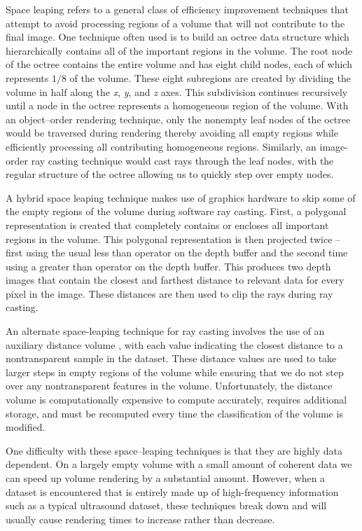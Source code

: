 Space leaping refers to a general class of efficiency improvement techniques that attempt to avoid processing regions of a volume that will not contribute to the final image. One technique often used is to build an octree data structure which hierarchically contains all of the important regions in the volume. The root node of the octree contains the entire volume and has eight child nodes, each of which represents $1/8$ of the volume. These eight subregions are created by dividing the volume in half along the \emph{x}, \emph{y}, and \emph{z} axes. This subdivision continues recursively until a node in the octree represents a homogeneous region of the volume. With an object--order rendering technique, only the nonempty leaf nodes of the octree would be traversed during rendering thereby avoiding all empty regions while efficiently processing all contributing homogeneous regions. Similarly, an image-order ray casting technique would cast rays through the leaf nodes, with the regular structure of the octree allowing us to quickly step over empty nodes.

A hybrid space leaping technique \cite{Sobierajski95} makes use of graphics hardware to skip some of the empty regions of the volume during software ray casting. First, a polygonal representation is created that completely contains or encloses all important regions in the volume. This polygonal representation is then projected twice -- first using the usual less than operator on the depth buffer and the
second time using a greater than operator on the depth buffer. This produces two depth images that contain the closest and farthest distance to relevant data for every pixel in the image. These distances are then used to clip the rays during ray casting.

An alternate space-leaping technique for ray casting involves the use of an auxiliary distance volume \cite{Zuiderveld92}, with each value indicating the closest distance to a nontransparent sample in the dataset. These distance values are used to take larger steps in empty regions of the volume while ensuring that we do not step over any nontransparent features in the volume. Unfortunately, the distance volume is computationally expensive to compute accurately, requires additional storage, and must be recomputed every time the classification of the volume is modified.

One difficulty with these space--leaping techniques is that they are highly data dependent. On a largely empty volume with a small amount of coherent data we can speed up volume rendering by a substantial amount. However, when a dataset is encountered that is entirely made up of high-frequency information such as a typical ultrasound dataset, these techniques break down and will usually cause rendering times to increase rather than decrease.

